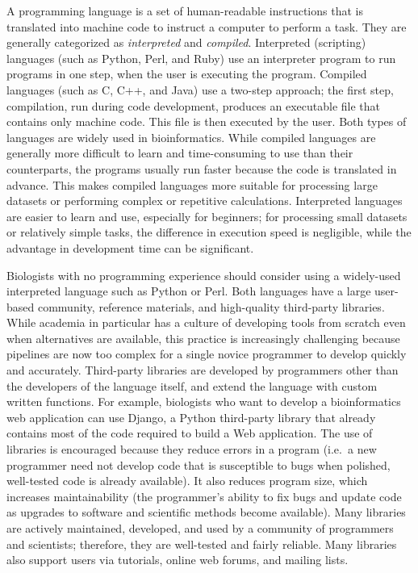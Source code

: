 \documentclass[ChapterTOCs,krantz2]{krantz} %
\begin{document}
A programming language is a set of human-readable instructions that is translated into
machine code to instruct a computer to perform a task.
They are generally categorized as \emph{interpreted} and \emph{compiled}.
Interpreted (scripting) languages (such as Python, Perl, and Ruby) use an
interpreter program to run programs in one step, 
when the user is executing the
program. Compiled languages (such as C, C++, and Java)
use a two-step approach; the first step, compilation, run 
during code development, produces an executable file that
contains only machine code. This file is then executed by the user. Both types of languages are widely used in
bioinformatics. While compiled languages are generally more difficult to learn
and time-consuming to use than their counterparts, the 
programs usually run faster because the code is translated in advance.
This makes compiled languages more suitable for processing large
datasets or performing complex or repetitive calculations. Interpreted languages are
easier to learn and use, especially for beginners; for processing 
small datasets or relatively simple
tasks, the difference in execution speed is negligible, while the advantage
in development time can be significant.

Biologists with no programming experience should consider using a widely-used 
interpreted language such as Python or Perl.
Both languages have a large user-based community, reference materials, and
high-quality third-party libraries.
While academia in particular has a culture of 
developing tools from scratch even when alternatives are available, this practice
is increasingly challenging because pipelines are now too complex for a single novice programmer 
to develop quickly and accurately\cite{Wilson2006}. Third-party libraries are developed 
by programmers other than the developers of the language itself, and extend the language
with custom written functions.  For example,   
biologists who want to develop a bioinformatics web application 
can use Django, a Python third-party library that already contains most of the
code required to build a Web application.  The use of libraries is encouraged because they
reduce errors in a program (i.e.\ a new programmer need not 
develop code that is susceptible to bugs when
polished, well-tested code is already available). It also reduces program size, 
which increases maintainability (the programmer's ability to fix 
bugs and update code as upgrades to software and scientific methods
become available).
Many libraries are actively maintained, developed, and used
by a community of programmers and scientists; therefore, they are well-tested
and fairly reliable. Many libraries also support users via tutorials, online
web forums, and mailing lists.
\end{document}
